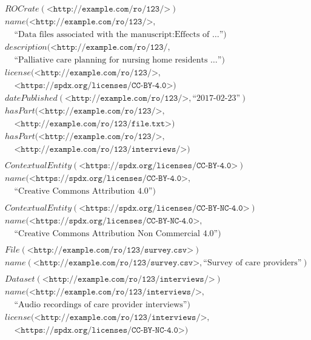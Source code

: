 \allowdisplaybreaks
\small
\begin{eqnarray*}
&& ROCrate(\texttt{<http://example.com/ro/123/>}) \\
&& name(\texttt{<http://example.com/ro/123/>}, \\
&& \ \ \ \ \ \text{“Data files associated with the manuscript:Effects of …”}) \\
&& description(\texttt{<http://example.com/ro/123/}, \\
&& \ \ \ \ \ \text{“Palliative care planning for nursing home residents …”}) \\
&& license(\texttt{<http://example.com/ro/123/>}, \\
&& \ \ \ \ \ \texttt{<https://spdx.org/licenses/CC-BY-4.0>}) \\
&& datePublished(\texttt{<http://example.com/ro/123/>}, \text{“2017-02-23”}) \\
&& hasPart(\texttt{<http://example.com/ro/123/>}, \\
&& \ \ \ \ \ \texttt{<http://example.com/ro/123/file.txt>}) \\
&& hasPart(\texttt{<http://example.com/ro/123/>}, \\
&& \ \ \ \ \ \texttt{<http://example.com/ro/123/interviews/>}) \\
\\
&& ContextualEntity(\texttt{<https://spdx.org/licenses/CC-BY-4.0>}) \\
&& name(\texttt{<https://spdx.org/licenses/CC-BY-4.0>},  \\
&& \ \ \ \ \  \text{“Creative Commons Attribution 4.0”}) \\
\\
&& ContextualEntity(\texttt{<https://spdx.org/licenses/CC-BY-NC-4.0>}) \\
&& name(\texttt{<https://spdx.org/licenses/CC-BY-NC-4.0>},  \\
&& \ \ \ \ \  \text{“Creative Commons Attribution Non Commercial 4.0”}) \\
\\
&& File(\texttt{<http://example.com/ro/123/survey.csv>}) \\
&& name(\texttt{<http://example.com/ro/123/survey.csv>},
        \text{“Survey of care providers”}) \\
\\
&& Dataset(\texttt{<http://example.com/ro/123/interviews/>}) \\
&& name(\texttt{<http://example.com/ro/123/interviews/>},  \\
&& \ \ \ \ \  \text{“Audio recordings of care provider interviews”}) \\
&& license(\texttt{<http://example.com/ro/123/interviews/>}, \\
&& \ \ \ \ \ \texttt{<https://spdx.org/licenses/CC-BY-NC-4.0>})
\end{eqnarray*}
\normalsize

